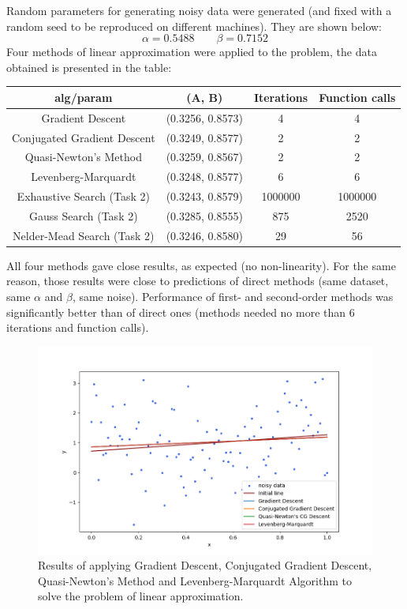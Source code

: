 \documentclass[12pt, a4paper]{article}
\begin{document}
Random parameters for generating noisy data were generated (and fixed with a random seed to be reproduced on different machines). They are shown below:
\[ \alpha = 0.5488 \qquad \beta = 0.7152 \]
Four methods of linear approximation were applied to the problem, the data obtained is presented in the table:
\begin{center}
\begin{tabular}{cccc}
\hline
alg/param                   & (A, B)           & Iterations & Function calls \\ \hline
Gradient Descent            & (0.3256, 0.8573) & 4          & 4              \\
Conjugated Gradient Descent & (0.3249, 0.8577) & 2          & 2              \\
Quasi-Newton's Method       & (0.3259, 0.8567) & 2          & 2              \\
Levenberg-Marquardt         & (0.3248, 0.8577) & 6          & 6              \\ \hline
Exhaustive Search (Task 2)  & (0.3243, 0.8579) & 1000000    & 1000000        \\
Gauss Search (Task 2)       & (0.3285, 0.8555) & 875        & 2520           \\
Nelder-Mead Search (Task 2) & (0.3246, 0.8580) & 29         & 56             \\ \hline
\end{tabular}
\end{center}
All four methods gave close results, as expected (no non-linearity). For the same reason, those results were close to predictions of direct methods (same dataset, same $\alpha$ and $\beta$, same noise). Performance of first- and second-order methods was significantly better than of direct ones (methods needed no more than 6 iterations and function calls).

\begin{figure}[!h]
\centering
\includegraphics[width=\textwidth]{line.png}
\caption{Results of applying Gradient Descent, Conjugated Gradient Descent, Quasi-Newton's Method and Levenberg-Marquardt Algorithm to solve the problem of linear approximation.}
\end{figure}
\end{document}
